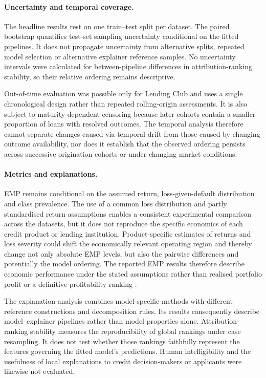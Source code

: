 \paragraph{Uncertainty and temporal coverage.}
The headline results rest on one train--test split per dataset. The paired bootstrap
quantifies test-set sampling uncertainty conditional on the fitted pipelines. It does
not propagate uncertainty from alternative splits, repeated model selection or
alternative explainer reference samples. No uncertainty intervals were calculated for
between-pipeline differences in attribution-ranking stability, so their relative
ordering remains descriptive.

Out-of-time evaluation was possible only for Lending Club and uses a single
chronological design rather than repeated rolling-origin assessments. It is also
subject to maturity-dependent censoring because later cohorts contain a smaller
proportion of loans with resolved outcomes. The temporal analysis therefore cannot
separate changes caused via temporal drift from those caused by changing outcome
availability, nor does it establish that the observed ordering persists across
successive origination cohorts or under changing market conditions.

\paragraph{Metrics and explanations.}
EMP remains conditional on the assumed return, loss-given-default distribution and
class prevalence. The use of a common loss distribution and partly standardised return
assumptions enables a consistent experimental comparison across the datasets, but it
does not reproduce the specific economics of each credit product or lending
institution. Product-specific estimates of returns and loss severity could shift the
economically relevant operating region and thereby change not only absolute EMP levels,
but also the pairwise differences and potentially the model ordering. The reported EMP
results therefore describe economic performance under the stated assumptions rather
than realised portfolio profit or a definitive profitability ranking
\citep{xuProfitRiskdrivenCredit2024}.

The explanation analysis combines model-specific methods with different reference
constructions and decomposition rules. Its results consequently describe
model--explainer pipelines rather than model properties alone. Attribution-ranking
stability measures the reproducibility of global rankings under case resampling. It
does not test whether those rankings faithfully represent the features governing the
fitted model's predictions. Human intelligibility and the usefulness of local
explanations to credit decision-makers or applicants were likewise not evaluated.

